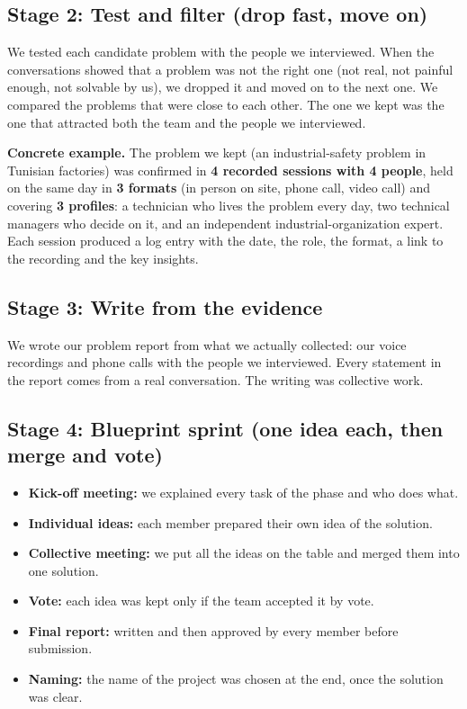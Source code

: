 \documentclass[11pt,a4paper]{article}
\begin{document}
\subsection{Stage 2: Test and filter (drop fast, move on)}
We tested each candidate problem with the people we interviewed. When the conversations showed that a problem was not the right one (not real, not painful enough, not solvable by us), we dropped it and moved on to the next one. We compared the problems that were close to each other. The one we kept was the one that attracted both the team and the people we interviewed.

\textbf{Concrete example.} The problem we kept (an industrial-safety problem in Tunisian factories) was confirmed in \textbf{4 recorded sessions with 4 people}, held on the same day in \textbf{3 formats} (in person on site, phone call, video call) and covering \textbf{3 profiles}: a technician who lives the problem every day, two technical managers who decide on it, and an independent industrial-organization expert. Each session produced a log entry with the date, the role, the format, a link to the recording and the key insights.

\subsection{Stage 3: Write from the evidence}
We wrote our problem report from what we actually collected: our voice recordings and phone calls with the people we interviewed. Every statement in the report comes from a real conversation. The writing was collective work.

\subsection{Stage 4: Blueprint sprint (one idea each, then merge and vote)}
\begin{itemize}
  \item \textbf{Kick-off meeting:} we explained every task of the phase and who does what.
  \item \textbf{Individual ideas:} each member prepared their own idea of the solution.
  \item \textbf{Collective meeting:} we put all the ideas on the table and merged them into one solution.
  \item \textbf{Vote:} each idea was kept only if the team accepted it by vote.
  \item \textbf{Final report:} written and then approved by every member before submission.
  \item \textbf{Naming:} the name of the project was chosen at the end, once the solution was clear.
\end{itemize}
\end{document}
